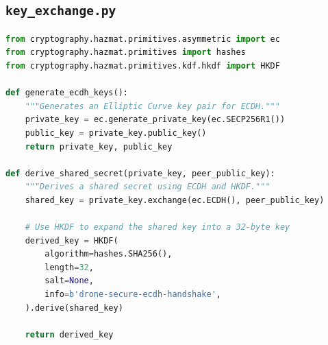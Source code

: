 \documentclass[12pt,a4paper]{article}
\begin{document}
\subsection{\texttt{key\_exchange.py}}
\begin{lstlisting}[language=Python]
from cryptography.hazmat.primitives.asymmetric import ec
from cryptography.hazmat.primitives import hashes
from cryptography.hazmat.primitives.kdf.hkdf import HKDF

def generate_ecdh_keys():
    """Generates an Elliptic Curve key pair for ECDH."""
    private_key = ec.generate_private_key(ec.SECP256R1())
    public_key = private_key.public_key()
    return private_key, public_key

def derive_shared_secret(private_key, peer_public_key):
    """Derives a shared secret using ECDH and HKDF."""
    shared_key = private_key.exchange(ec.ECDH(), peer_public_key)
    
    # Use HKDF to expand the shared key into a 32-byte key
    derived_key = HKDF(
        algorithm=hashes.SHA256(),
        length=32,
        salt=None,
        info=b'drone-secure-ecdh-handshake',
    ).derive(shared_key)
    
    return derived_key

\end{lstlisting}
\end{document}
